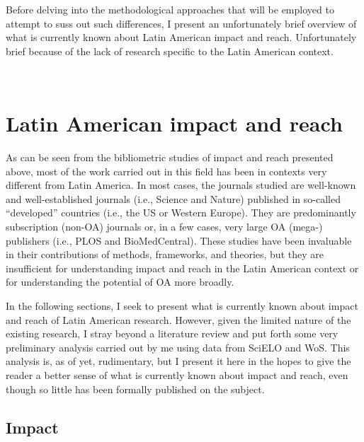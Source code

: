Before delving into the methodological approaches that will be employed to attempt to suss out such differences, I present an unfortunately brief overview of what is currently known about Latin American impact and reach. Unfortunately brief because of the lack of research specific to the Latin American context.

~\nocite{Mulvany2014}

\section{Latin American impact and reach}
\label{latinamericanimpactandreach}

As can be seen from the bibliometric studies of impact and reach presented above, most of the work carried out in this field has been in contexts very different from Latin America. In most cases, the journals studied are well-known and well-established journals (i.e., Science and Nature) published in so-called ``developed'' countries (i.e., the US or Western Europe). They are predominantly subscription (non-OA) journals or, in a few cases, very large OA (mega-) publishers (i.e., PLOS and BioMedCentral). These studies have been invaluable in their contributions of methods, frameworks, and theories, but they are insufficient for understanding impact and reach in the Latin American context or for understanding the potential of OA more broadly.

In the following sections, I seek to present what is currently known about impact and reach of Latin American research. However, given the limited nature of the existing research, I stray beyond a literature review and put forth some very preliminary analysis carried out by me using data from SciELO and WoS. This analysis is, as of yet, rudimentary, but I present it here in the hopes to give the reader a better sense of what is currently known about impact and reach, even though so little has been formally published on the subject.

\subsection{Impact}
\label{impact}

